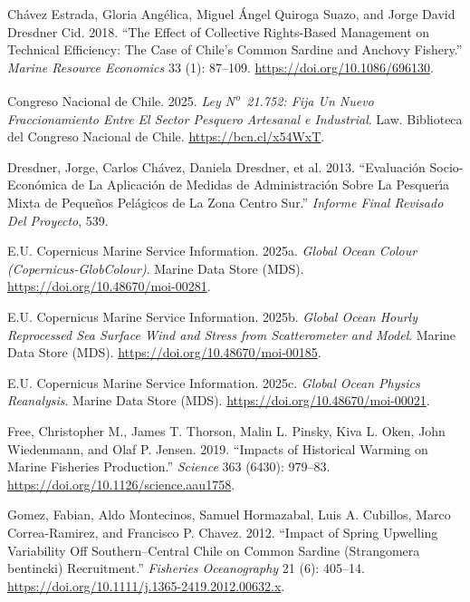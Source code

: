 \documentclass[
  11pt,
]{article}
\newlength{\cslhangindent}
\newenvironment{CSLReferences}[2] %
 {\begin{list}{}{%
  \setlength{\itemindent}{0pt}
  \setlength{\leftmargin}{0pt}
  \setlength{\parsep}{0pt}
  \ifodd #1
   \setlength{\leftmargin}{\cslhangindent}
   \setlength{\itemindent}{-1\cslhangindent}
  \fi
  \setlength{\itemsep}{#2\baselineskip}}}
 {\end{list}}
\begin{document}
\begin{CSLReferences}{1}{1}
Chávez Estrada, Gloria Angélica, Miguel Ángel Quiroga Suazo, and Jorge David Dresdner Cid. 2018. {``The Effect of Collective Rights-Based Management on Technical Efficiency: The Case of Chile's Common Sardine and Anchovy Fishery.''} \emph{Marine Resource Economics} 33 (1): 87--109. \url{https://doi.org/10.1086/696130}.

Congreso Nacional de Chile. 2025. \emph{Ley {N\textsuperscript{o}}~21.752: Fija Un Nuevo Fraccionamiento Entre El Sector Pesquero Artesanal e Industrial}. Law. Biblioteca del Congreso Nacional de Chile. \url{https://bcn.cl/x54WxT}.

Dresdner, Jorge, Carlos Chávez, Daniela Dresdner, et al. 2013. {``Evaluaci{ó}n Socio-Econ{ó}mica de La Aplicaci{ó}n de Medidas de Administraci{ó}n Sobre La Pesquer{ı́}a Mixta de Peque{ñ}os Pel{á}gicos de La Zona Centro Sur.''} \emph{Informe Final Revisado Del Proyecto}, 539.

E.U. Copernicus Marine Service Information. 2025a. \emph{Global Ocean Colour (Copernicus-GlobColour)}. Marine Data Store (MDS). \url{https://doi.org/10.48670/moi-00281}.

E.U. Copernicus Marine Service Information. 2025b. \emph{Global Ocean Hourly Reprocessed Sea Surface Wind and Stress from Scatterometer and Model}. Marine Data Store (MDS). \url{https://doi.org/10.48670/moi-00185}.

E.U. Copernicus Marine Service Information. 2025c. \emph{Global Ocean Physics Reanalysis}. Marine Data Store (MDS). \url{https://doi.org/10.48670/moi-00021}.

Free, Christopher M., James T. Thorson, Malin L. Pinsky, Kiva L. Oken, John Wiedenmann, and Olaf P. Jensen. 2019. {``Impacts of Historical Warming on Marine Fisheries Production.''} \emph{Science} 363 (6430): 979--83. \url{https://doi.org/10.1126/science.aau1758}.

Gomez, Fabian, Aldo Montecinos, Samuel Hormazabal, Luis A. Cubillos, Marco Correa-Ramirez, and Francisco P. Chavez. 2012. {``Impact of Spring Upwelling Variability Off Southern--Central {Chile} on Common Sardine ({Strangomera bentincki}) Recruitment.''} \emph{Fisheries Oceanography} 21 (6): 405--14. \url{https://doi.org/10.1111/j.1365-2419.2012.00632.x}.


\end{CSLReferences}
\end{document}
